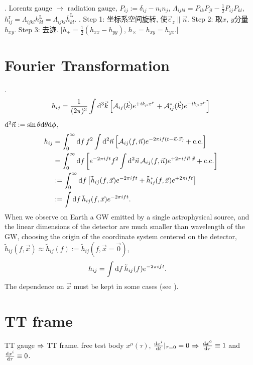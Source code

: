 \cite{Maggiore2014}. Lorentz gauge $\to$ radiation gauge, $P_{ij}:=\delta_{ij}-n_in_j$, $\Lambda_{ijkl}=P_{ik}P_{jl}-\frac{1}{2}P_{ij}P_{kl}$, $h_{ij}^\text{r}=\Lambda_{ijkl}h_{kl}^\text{L}=\Lambda_{ijkl}\bar{h}_{kl}^\text{L}$. \cite{Sathyaprakash2009}. Step 1: 坐标系空间旋转, 使$\vec{e}_z\parallel\vec{n}$. Step 2: 取$x$, $y$分量$h_{xy}$. Step 3: 去迹. [$h_+=\frac{1}{2}(h_{xx}-h_{yy})$, $h_\times=h_{xy}=h_{yx}$.]

\section{Fourier Transformation}

\def\A{\mathcal{A}}
\cite{Maggiore2014}. 
\begin{equation}
    h_{ij}=\frac{1}{(2\pi)^3}\int\d^3\vec{k}\left[\A_{ij}(\vec{k})e^{+ik_\mu x^\mu}+\A_{ij}^*(\vec{k})e^{-ik_\mu x^\mu}\right]
\end{equation}
$\mathrm{d}^2\vec{n}:=\sin\theta\mathrm{d}\theta\mathrm{d}\phi$,
\begin{align}
    h_{ij}&=\int_0^\infty\d f\, f^2\int\d^2\vec{n}\left[\A_{ij}(f,\vec{n})e^{-2\pi i f(t-\vec{n}\cdot\vec{x})}+\text{c.c.}\right]\\
    &=\int_0^\infty\d f\left[e^{-2\pi i ft}f^2\int\d^2\vec{n}\,\A_{ij}(f,\vec{n})e^{+2\pi i f\vec{n}\cdot\vec{x}}+\text{c.c.}\right]\\
    &:=\int_0^\infty\d f\left[\tilde{h}_{ij}(f,\vec{x})e^{-2\pi i ft}+\tilde{h}_{ij}^*(f,\vec{x})e^{+2\pi i ft}\right]\\
    &:=\int\d f\,\tilde{h}_{ij}(f,\vec{x})e^{-2\pi i ft}.
\end{align}
When we observe on Earth a GW emitted by a single astrophysical source, and the linear dimensions of the detector are much smaller than wavelength of the GW, choosing the origin of the coordinate system centered on the detector, $\tilde{h}_{ij}(f,\vec{x})\approx\tilde{h}_{ij}(f):=\tilde{h}_{ij}(f,\vec{x}=\vec{0})$,
\begin{align}
    h_{ij}&=\int\mathrm{d} f\,\tilde{h}_{ij}(f)e^{-2\pi i ft}.
\end{align}
The dependence on $\vec{x}$ must be kept in some cases (see \cite{Maggiore2014}).

\section{TT frame}

TT gauge $\Rightarrow$ TT frame. free test body $x^\mu(\tau)$, $\frac{\mathrm{d} x^i}{\mathrm{d} t}|_{\tau=0}=0$ $\Rightarrow$ $\frac{\mathrm{d} x^0}{\mathrm{d} \tau}\equiv1$ and $\frac{\mathrm{d} x^i}{\mathrm{d} \tau}\equiv0$.

